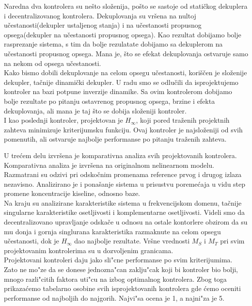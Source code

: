 \documentclass[a4paper,11pt]{article}
\theoremstyle{definition} \newtheorem{deff}{Definicija}[section]
\theoremstyle{definition} \newtheorem{prim}[deff]{Primer}
\theoremstyle{plain} \newtheorem{teor}[deff]{Teorema}
\begin{document}
			Naredna dva kontrolera su nešto složenija, pošto se sastoje od statičkog dekuplera i decentralizovanog kontrolera. Dekuplovanja su vršena na nultoj učestanosti(dekupler ustaljenog stanja) i na učestanosti propusnog opsega(dekupler na učestanosti propusnog opsega). Kao rezultat dobijamo bolje rasprezanje sistema, s tim da bolje rezulatate dobijamo sa dekuplerom na učestanosti propusnog opsega. Mana je, što se efekat dekuplovanja ostvaruje samo na nekom od opsega učestanosti. \\
			
			Kako bismo dobili dekuplovanje na celom opsegu učestanosti, koriščen je složenije dekupler, tačnije dinamički dekupler. U radu smo se odlučili da isprojektujemo kontroler na bazi potpune inverzije dinamike. Sa ovim kontrolerom dobijamo bolje rezultate po pitanju ostavrenog propusnog opsega, brzine i efekta dekuplovanja, ali mana je taj što se dobija složeniji kontroler. \\
			
			I kao poslednji kontroler, projektovan je $H_{\infty}$, koji pored traženih projektnih zahteva minimizuje kriterijumsku funkciju. Ovaj kontroler je najsloženiji od svih pomenutih, ali ostvaruje najbolje performanse po pitanju traženih zahteva. \\
			
			\clearpage
			
			U trećem delu izvršena je komparativna analiza svih projektovanih kontrolera. Komparativna analiza je izvršena na originalnom nelinearnom modelu. Razmatrani su odzivi pri odskočnim promenama reference prvog i drugog izlaza nezavisno. Analizirano je i ponašanje sistema u prisustvu poremećaja u vidu step promene koncentracije kiseline, odnosno baze.\\ 
			
			Na kraju su analizirane karakteristike sistema u frekvencijskom domenu, tačnije singularne karakteristike osetljivosti i komplementarne osetljivosti. Videli smo da decentralizovano upravljanje odskače u odnosu na ostale kontorlere obzirom da su mu donja i gornja singlurana karakteristika razmaknute na celom opsegu učestanosti, dok je $H_{\infty}$ dao najbolje rezultate. Vršne vrednosti $M_S$ i $M_T$ pri svim projektovanim kontrolerima su u dozvoljenim granicama. \\ 
			
			Projektovani kontroleri daju jako sli"cne performanse po svim kriterijumima. Zato ne mo"ze da se donese jednozna"can zaklju"cak koji bi kontroler bio bolji, mnogo razli"citih faktora uti"cu na izbog optimalnog kontrolera. Zbog toga prikaza\'cemo tabelarno osobine svih isprojektovanih kontrolera gde \'cemo oceniti performanse od najboljih do najgorih. Najvi"sa ocena je 1, a najni"za je 5.\\
			
\end{document}
